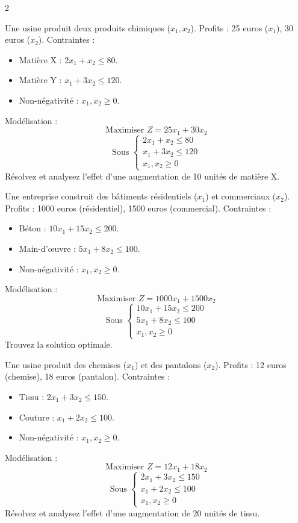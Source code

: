 \begin{multicols}{2}
\begin{exercice}
	Une usine produit deux produits chimiques (\(x_1, x_2\)). Profits : 25 euros (\(x_1\)), 30 euros (\(x_2\)). Contraintes :
	\begin{itemize}
		\item Matière X : \(2x_1 + x_2 \leq 80\).
		\item Matière Y : \(x_1 + 3x_2 \leq 120\).
		\item Non-négativité : \(x_1, x_2 \geq 0\).
	\end{itemize}
	Modélisation :
	\[
	\text{Maximiser } Z = 25x_1 + 30x_2
	\]
	\[
	\text{Sous } \begin{cases}
	2x_1 + x_2 \leq 80 \\
	x_1 + 3x_2 \leq 120 \\
	x_1, x_2 \geq 0
	\end{cases}
	\]
	Résolvez et analysez l'effet d'une augmentation de 10 unités de matière X.
\end{exercice}

\begin{exercice}
	Une entreprise construit des bâtiments résidentiels (\(x_1\)) et commerciaux (\(x_2\)). Profits : 1000 euros (résidentiel), 1500 euros (commercial). Contraintes :
	\begin{itemize}
		\item Béton : \(10x_1 + 15x_2 \leq 200\).
		\item Main-d'œuvre : \(5x_1 + 8x_2 \leq 100\).
		\item Non-négativité : \(x_1, x_2 \geq 0\).
	\end{itemize}
	Modélisation :
	\[
	\text{Maximiser } Z = 1000x_1 + 1500x_2
	\]
	\[
	\text{Sous } \begin{cases}
	10x_1 + 15x_2 \leq 200 \\
	5x_1 + 8x_2 \leq 100 \\
	x_1, x_2 \geq 0
	\end{cases}
	\]
	Trouvez la solution optimale.
\end{exercice}

\begin{exercice}
	Une usine produit des chemises (\(x_1\)) et des pantalons (\(x_2\)). Profits : 12 euros (chemise), 18 euros (pantalon). Contraintes :
	\begin{itemize}
		\item Tissu : \(2x_1 + 3x_2 \leq 150\).
		\item Couture : \(x_1 + 2x_2 \leq 100\).
		\item Non-négativité : \(x_1, x_2 \geq 0\).
	\end{itemize}
	Modélisation :
	\[
	\text{Maximiser } Z = 12x_1 + 18x_2
	\]
	\[
	\text{Sous } \begin{cases}
	2x_1 + 3x_2 \leq 150 \\
	x_1 + 2x_2 \leq 100 \\
	x_1, x_2 \geq 0
	\end{cases}
	\]
	Résolvez et analysez l'effet d'une augmentation de 20 unités de tissu.
\end{exercice}

\end{multicols}
